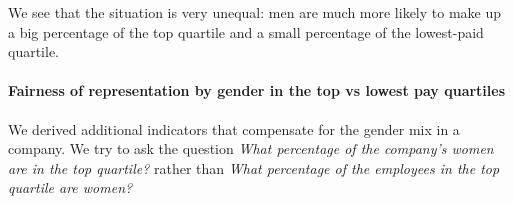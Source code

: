 We see that the situation is very unequal: men are much more likely to make up a big percentage of the top quartile and a small percentage of the lowest-paid quartile.
    

\paragraph{Fairness of representation by gender in the top vs lowest pay quartiles}
  We derived additional indicators that compensate for the gender mix in a company. We try to ask the question \textit{What percentage of the company's women are in the top quartile?} rather than \textit{What percentage of the employees in the top quartile are women?} 
   
